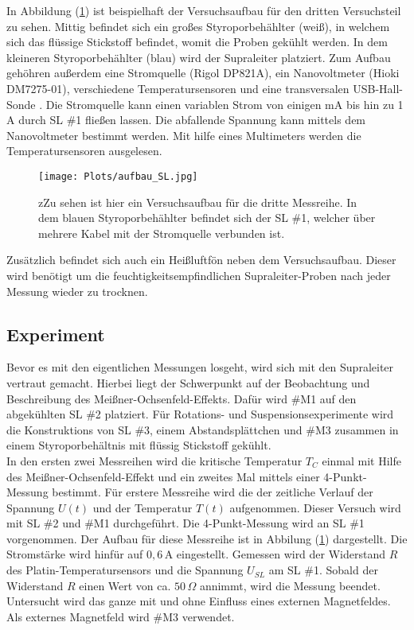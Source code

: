 In Abbildung (\ref{abb:aufbau}) ist beispielhaft der Versuchsaufbau f\"ur den dritten Versuchsteil zu sehen.
Mittig befindet sich ein gro{\ss}es Styroporbeh\"ahlter (wei{\ss}), in welchem sich das fl\"ussige Stickstoff befindet, womit die Proben gek\"uhlt werden.
In dem kleineren Styroporbeh\"ahlter (blau) wird der Supraleiter platziert.
Zum Aufbau geh\"ohren au{\ss}erdem eine Stromquelle (Rigol DP821A), ein Nanovoltmeter (Hioki DM7275-01), verschiedene Temperatursensoren und eine transversalen USB-Hall-Sonde .
Die Stromquelle kann einen variablen Strom von einigen mA bis hin zu 1 A durch SL \#1 flie{\ss}en lassen.
Die abfallende Spannung kann mittels dem Nanovoltmeter bestimmt werden.
Mit hilfe eines Multimeters werden die Temperatursensoren ausgelesen.
\begin{figure}[hbtp]
	\centering
	\texttt{[image: Plots/aufbau\_SL.jpg]}
	\caption{zZu sehen ist hier ein Versuchsaufbau f\"ur die dritte Messreihe. In dem blauen Styroporbeh\"ahlter befindet sich der SL \#1, welcher \"uber mehrere Kabel mit der Stromquelle verbunden ist.}
	\label{abb:aufbau}
\end{figure}
Zus\"atzlich befindet sich auch ein Heißluftfön neben dem Versuchsaufbau.
Dieser wird ben\"otigt um die feuchtigkeitsempfindlichen Supraleiter-Proben nach jeder Messung wieder zu trocknen.

\subsection{Experiment}
Bevor es mit den eigentlichen Messungen losgeht, wird sich mit den Supraleiter vertraut gemacht.
Hierbei liegt der Schwerpunkt auf der Beobachtung und Beschreibung des Meißner-Ochsenfeld-Effekts.
Daf\"ur wird \#M1 auf den abgekühlten SL \#2 platziert.
Für Rotations- und Suspensionsexperimente wird die Konstruktions von SL \#3, einem Abstandsplättchen und \#M3 zusammen in einem Styroporbehältnis mit fl\"ussig Stickstoff gek\"uhlt. \\

In den ersten zwei Messreihen wird die kritische Temperatur $T_C$ einmal mit Hilfe des Meißner-Ochsenfeld-Effekt und ein zweites Mal mittels einer 4-Punkt-Messung bestimmt.
F\"ur erstere Messreihe wird die der zeitliche Verlauf der Spannung $U(t)$ und der Temperatur $T(t)$ aufgenommen.
Dieser Versuch wird mit SL \#2 und \#M1 durchgef\"uhrt.
Die 4-Punkt-Messung wird an SL \#1 vorgenommen.
Der Aufbau f\"ur diese Messreihe ist in Abbilung (\ref{abb:aufbau}) dargestellt.
Die Stromst\"arke wird hinf\"ur auf $0,6 \,$A eingestellt.
Gemessen wird der Widerstand $R$ des Platin-Temperatursensors und die Spannung $U_{SL}$ am SL \#1.
Sobald der Widerstand $R$ einen Wert von ca. $50 \, \Omega$ annimmt, wird die Messung beendet.
Untersucht wird das ganze mit und ohne Einfluss eines externen Magnetfeldes.
Als externes Magnetfeld wird \#M3 verwendet. \\

